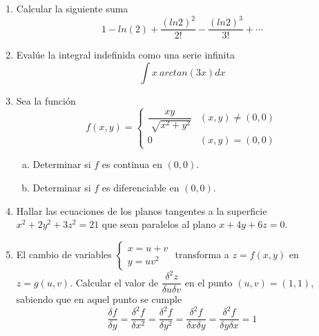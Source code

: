 \documentclass[12pt]{article}
\newenvironment{preguntas}
{\begin{enumerate}\itemsep12pt
	}
	{
	\end{enumerate}
}
\begin{document}
\begin{preguntas}
\item Calcular la siguiente suma
	$$1 - ln(2) + \dfrac{(ln2)^2}{2!}-\dfrac{(ln2)^3}{3!}+\cdots$$
\item Evalúe la integral indefinida como una serie infinita
	$$\int x\ arctan(3x)dx$$
\item Sea la función
	$$f(x,y)=
	\begin{cases}
	\dfrac{xy}{\sqrt[]{x^2+y^2}} & (x,y) \neq (0,0)\\
	0 & (x,y)=(0,0)
	\end{cases}
	$$
\begin{enumerate}[a)]
\item Determinar si $f$ es continua en $(0,0)$.
\item Determinar si $f$ es diferenciable en $(0,0)$.
\end{enumerate}
\item Hallar las ecuaciones de los planos tangentes a la superficie $x^2 + 2y^2 + 3z^2 = 21$ que sean paralelos al plano $x + 4y + 6z = 0$.
\item El cambio de variables 
	$\begin{cases}
	x=u+v\\
	y=uv^2
	\end{cases}$
	transforma a $z=f(x,y)$ en $z=g(u,v)$. Calcular el valor de $\dfrac{\delta^2z}{\delta u \delta v}$ en el punto $(u,v) = (1,1)$, sabiendo que en aquel punto se cumple$$\dfrac{\delta f}			{\delta y} = \dfrac{\delta^2 f}{\delta x^2}=\dfrac{\delta^2 f}{\delta y^2}=\dfrac{\delta^2 f}{\delta x \delta y}=\dfrac{\delta^2 f}{\delta y \delta x}=1$$
\end{preguntas}
\end{document}
